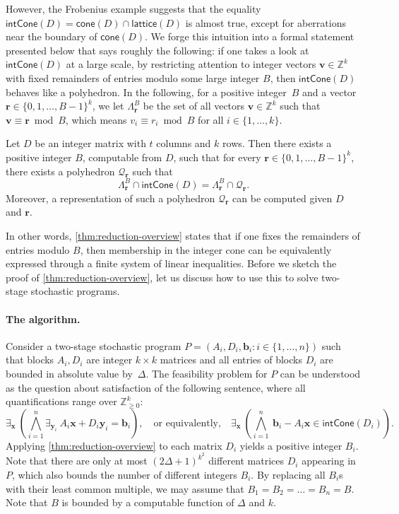 \documentclass{theoretics}
\renewcommand{\geq}{\geqslant}
\newcommand{\Z}{\mathbb{Z}}
\newcommand{\Zn}{\Z_{\geq 0}}
\newcommand{\tup}[1]{{\mathbf{#1}}}
\newcommand{\xx}{\tup x}
\newcommand{\yy}{\tup y}
\newcommand{\bb}{\tup b}
\newcommand{\rr}{\tup r}
\newcommand{\myvv}{\tup v} %
\newcommand{\Qq}{\mathcal{Q}}
\newcommand{\realcone}{\mathsf{cone}}
\newcommand{\intcone}{\mathsf{intCone}}
\newcommand{\lattice}{\mathsf{lattice}}
\begin{document}
However, the Frobenius example suggests that the equality $\intcone(D)=\realcone(D)\cap \lattice(D)$ is almost true, except for aberrations near the boundary of $\realcone(D)$. We forge this intuition into a formal statement presented below that says roughly the following: if one takes a look at $\intcone(D)$ at a large scale, by restricting attention to integer vectors $\myvv\in \Z^k$ with fixed remainders of entries modulo some large integer $B$, then $\intcone(D)$ behaves like a polyhedron. In the following, for a positive integer~$B$ and a vector $\rr\in \{0,1,\ldots,B-1\}^k$, we let $\Lambda_\rr^B$ be the set of all vectors $\myvv\in \Z^k$ such that $\myvv\equiv \rr\bmod B$, which means $v_i\equiv r_i\bmod B$ for all $i\in \{1,\ldots,k\}$.

\begin{theorem}\label{thm:reduction-overview}
Let $D$ be an integer matrix with $t$ columns and $k$ rows. Then there exists a positive integer $B$, computable from $D$, such that for every ${\rr\in \{0,1,\ldots,B-1\}^k}$, there exists a polyhedron $\Qq_\rr$ such that
$$\Lambda_\rr^B\cap \intcone(D) = \Lambda_\rr^B\cap \Qq_\rr.$$
Moreover, a representation of such a polyhedron $\Qq_\rr$ can be computed given $D$ and $\rr$.
\end{theorem}

In other words, \cref{thm:reduction-overview} states that if one fixes the remainders of entries modulo $B$, then membership in the integer cone can be equivalently expressed through a finite system of linear inequalities. Before we sketch the proof of \cref{thm:reduction-overview}, let us discuss how to use this to solve two-stage stochastic programs.

\paragraph*{The algorithm.} Consider a two-stage stochastic program $P=(A_i,D_i,\bb_i\colon i\in \{1,\ldots,n\})$ such that blocks $A_i,D_i$ are integer $k\times k$ matrices and all entries of blocks $D_i$ are bounded in absolute value by~$\Delta$. The feasibility problem for $P$ can be understood as the question about satisfaction of the following sentence, where all quantifications range over $\Zn^k$:
\begin{equation}\label{eq:hipopotam}
    \exists_{\xx}\ \left(\bigwedge_{i=1}^n \exists_{\yy_i}\  A_i\xx+D_i\yy_i = \bb_i\right),\quad\textrm{or equivalently,}\quad \exists_{\xx}\ \left(\bigwedge_{i=1}^n\ \bb_i-A_i\xx\in \intcone(D_i)\right).
\end{equation}
Applying \cref{thm:reduction-overview} to each matrix $D_i$ yields a positive integer $B_i$. Note that there are only at most $(2\Delta+1)^{k^2}$ different matrices $D_i$ appearing in $P$, which also bounds the number of different integers $B_i$. By replacing all $B_i$s with their least common multiple, we may assume that $B_1=B_2=\ldots=B_n=B$. Note that $B$ is bounded by a computable function of $\Delta$ and $k$.
\end{document}
